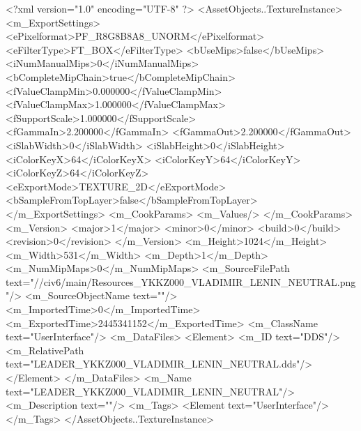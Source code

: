 <?xml version="1.0" encoding="UTF-8" ?>
<AssetObjects..TextureInstance>
	<m_ExportSettings>
		<ePixelformat>PF_R8G8B8A8_UNORM</ePixelformat>
		<eFilterType>FT_BOX</eFilterType>
		<bUseMips>false</bUseMips>
		<iNumManualMips>0</iNumManualMips>
		<bCompleteMipChain>true</bCompleteMipChain>
		<fValueClampMin>0.000000</fValueClampMin>
		<fValueClampMax>1.000000</fValueClampMax>
		<fSupportScale>1.000000</fSupportScale>
		<fGammaIn>2.200000</fGammaIn>
		<fGammaOut>2.200000</fGammaOut>
		<iSlabWidth>0</iSlabWidth>
		<iSlabHeight>0</iSlabHeight>
		<iColorKeyX>64</iColorKeyX>
		<iColorKeyY>64</iColorKeyY>
		<iColorKeyZ>64</iColorKeyZ>
		<eExportMode>TEXTURE_2D</eExportMode>
		<bSampleFromTopLayer>false</bSampleFromTopLayer>
	</m_ExportSettings>
	<m_CookParams>
		<m_Values/>
	</m_CookParams>
	<m_Version>
		<major>1</major>
		<minor>0</minor>
		<build>0</build>
		<revision>0</revision>
	</m_Version>
	<m_Height>1024</m_Height>
	<m_Width>531</m_Width>
	<m_Depth>1</m_Depth>
	<m_NumMipMaps>0</m_NumMipMaps>
	<m_SourceFilePath text="//civ6/main/Resources\LEADER_YKKZ000_VLADIMIR_LENIN_NEUTRAL.png"/>
	<m_SourceObjectName text=""/>
	<m_ImportedTime>0</m_ImportedTime>
	<m_ExportedTime>2445341152</m_ExportedTime>
	<m_ClassName text="UserInterface"/>
	<m_DataFiles>
		<Element>
			<m_ID text="DDS"/>
			<m_RelativePath text="LEADER_YKKZ000_VLADIMIR_LENIN_NEUTRAL.dds"/>
		</Element>
	</m_DataFiles>
	<m_Name text="LEADER_YKKZ000_VLADIMIR_LENIN_NEUTRAL"/>
	<m_Description text=""/>
	<m_Tags>
		<Element text="UserInterface"/>
	</m_Tags>
</AssetObjects..TextureInstance>


